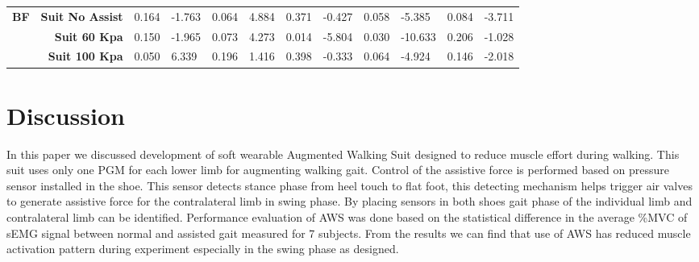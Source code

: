 \documentclass[letterpaper, 10 pt, conference]{ieeeconf}  %
\begin{document}
\begin{table*}[]
\begin{tabular}{@{}lrllllllllll@{}}
		\textbf{BF}                          & \textbf{Suit No Assist}                 & 0.164                                & -1.763                               & 0.064                                & 4.884                                & 0.371                                & -0.427                               & 0.058                                & -5.385                               & 0.084                                & -3.711                               \\
		\textbf{}                            & \textbf{Suit 60 Kpa}                    & 0.150                                & -1.965                               & 0.073                                & 4.273                                & 0.014                                & -5.804                               & 0.030                                & -10.633                              & 0.206                                & -1.028                               \\
		\textbf{}                            & \textbf{Suit 100 Kpa}                   & 0.050                                & 6.339                                & 0.196                                & 1.416                                & 0.398                                & -0.333                               & 0.064                                & -4.924                               & 0.146                                & -2.018                               \\ \bottomrule
	\end{tabular}

	\label{ptvalues}
\end{table*}

\section{Discussion} \label{discuss}

In this paper we discussed development of soft wearable Augmented Walking Suit designed to reduce muscle effort during walking. This suit uses only one PGM for each lower limb for augmenting walking gait. Control of the assistive force is performed based on pressure sensor installed in the shoe. This sensor detects stance phase from heel touch to flat foot, this detecting mechanism helps trigger air valves to generate assistive force for the contralateral limb in swing phase. By placing sensors in both shoes gait phase of the individual limb and contralateral limb can be identified. Performance evaluation of AWS was done based on the statistical difference in the average \%MVC of sEMG signal between normal and assisted gait measured for 7 subjects. From the results we can find that use of AWS has reduced muscle activation pattern during experiment especially in the swing phase as designed. 
\end{document}
